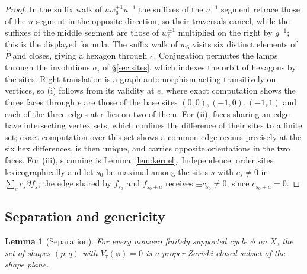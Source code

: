 \documentclass[11pt]{article}
\newtheorem{lemma}[theorem]{Lemma}
\theoremstyle{definition}
\theoremstyle{remark}
\begin{document}
\begin{proof}
In the suffix walk of $uw_6^{\pm1}u^{-1}$ the suffixes of the $u^{-1}$
segment retrace those of the $u$ segment in the opposite direction, so their
traversals cancel, while the suffixes of the middle segment are those of
$w_6^{\pm1}$ multiplied on the right by $g^{-1}$; this is the displayed
formula. The suffix walk of $w_6$ visits six distinct elements of $\widehat
P$ and closes, giving a hexagon through $e$. Conjugation permutes the lamps
through the involutions $\sigma_i$ of \S\ref{sec:sites}, which indexes the
orbit of hexagons by the sites. Right translation is a graph automorphism
acting transitively on vertices, so (i) follows from its validity at $e$,
where exact computation shows the three faces through $e$ are those of the
base sites $(0,0),(-1,0),(-1,1)$ and each of the three edges at $e$ lies on
two of them. For (ii), faces sharing an edge have intersecting vertex sets,
which confines the difference of their sites to a finite set; exact
computation over this set shows a common edge occurs precisely at the six hex
differences, is then unique, and carries opposite orientations in the two
faces. For (iii), spanning is Lemma~\ref{lem:kernel}. Independence: order
sites lexicographically and let $s_0$ be maximal among the sites $s$ with
$c_s\neq0$ in
$\sum_s c_s\partial f_s$; the edge shared by $f_{s_0}$ and $f_{s_0+a}$
receives $\pm c_{s_0}\neq0$, since $c_{s_0+a}=0$.
\end{proof}

\subsection{Separation and genericity}

\begin{lemma}[Separation]\label{lem:sep}
For every nonzero finitely supported cycle $\phi$ on $X$, the set of shapes
$(p,q)$ with $V_\tau(\phi)=0$ is a proper Zariski-closed subset of the shape
plane.
\end{lemma}
\end{document}
